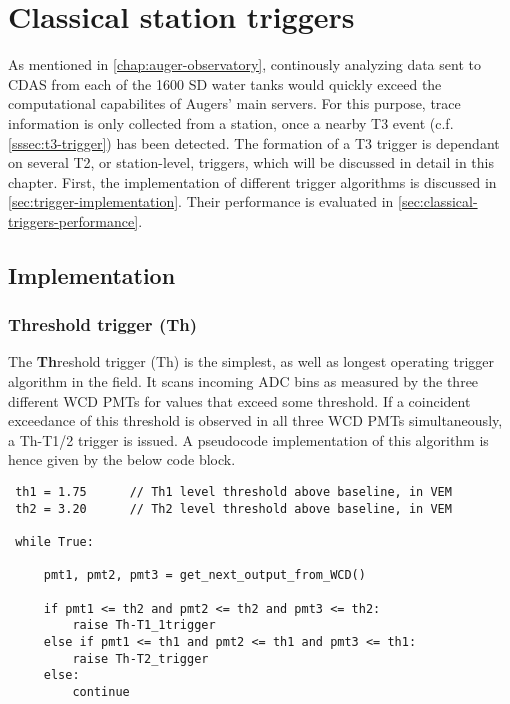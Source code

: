 
\chapter{Classical station triggers}
\label{chap:classical-triggers}

As mentioned in \autoref{chap:auger-observatory}, continously analyzing data sent to CDAS from each of the 1600 SD water tanks would quickly exceed the 
computational capabilites of Augers' main servers. For this purpose, trace information is only collected from a station, once a nearby T3 event 
(c.f. \autoref{sssec:t3-trigger}) has been detected. The formation of a T3 trigger is dependant on several T2, or station-level, triggers, which will
be discussed in detail in this chapter. First, the implementation of different trigger algorithms is discussed in \autoref{sec:trigger-implementation}.
Their performance is evaluated in \autoref{sec:classical-triggers-performance}.

\section{Implementation}
\label{sec:classical-trigger-implementation}

\subsection{Threshold trigger (Th)}
\label{ssec:threshold-trigger}

The \textbf{Th}reshold trigger (Th) is the simplest, as well as longest operating trigger algorithm \cite{triggerGuide} in the field. It scans incoming 
ADC bins as measured by the three different WCD PMTs for values that exceed some threshold. If a coincident exceedance of this threshold is observed in 
all three WCD PMTs simultaneously, a Th-T1/2 trigger is issued. A pseudocode implementation of this algorithm is hence given by the below code block.

\begin{lstlisting}
 th1 = 1.75      // Th1 level threshold above baseline, in VEM   
 th2 = 3.20      // Th2 level threshold above baseline, in VEM  

 while True:

     pmt1, pmt2, pmt3 = get_next_output_from_WCD()

     if pmt1 <= th2 and pmt2 <= th2 and pmt3 <= th2:
         raise Th-T1_1trigger
     else if pmt1 <= th1 and pmt2 <= th1 and pmt3 <= th1:
         raise Th-T2_trigger
     else: 
         continue
\end{lstlisting}

